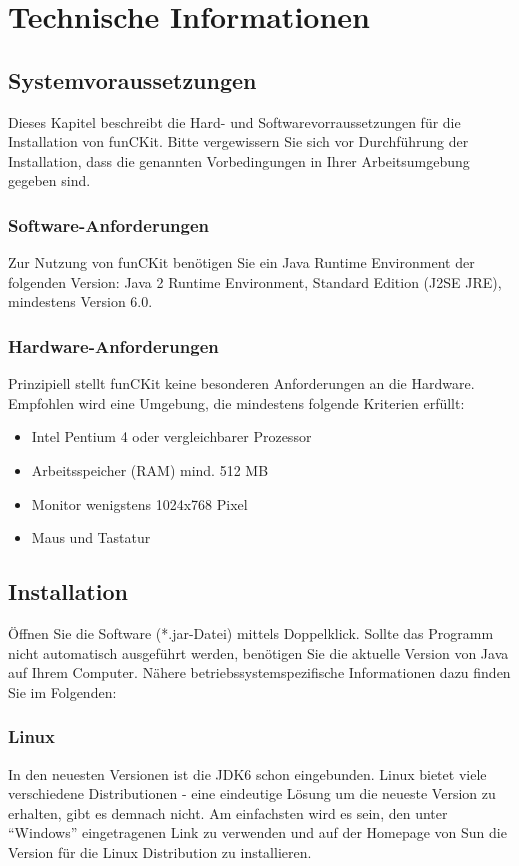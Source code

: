 \documentclass[12pt,a4paper]{scrartcl}
\newcommand{\projectName}{funCKit\xspace} %
\begin{document}
% 
%
\newpage
\section{Technische Informationen}
\subsection{Systemvoraussetzungen}
Dieses Kapitel beschreibt die Hard- und Softwarevorraussetzungen für die Installation von \projectName. Bitte vergewissern Sie sich vor Durchführung der Installation, dass die genannten Vorbedingungen in Ihrer Arbeitsumgebung gegeben sind.
\subsubsection{Software-Anforderungen}
Zur Nutzung von \projectName benötigen Sie ein Java Runtime Environment der folgenden Version: Java 2 Runtime Environment, Standard Edition (J2SE JRE), mindestens Version 6.0.
\subsubsection{Hardware-Anforderungen}
Prinzipiell stellt \projectName keine besonderen Anforderungen an die Hardware. Empfohlen wird eine Umgebung, die mindestens folgende Kriterien erfüllt:
\begin{itemize}
		 \item Intel Pentium 4 oder vergleichbarer Prozessor
		 \item Arbeitsspeicher (RAM) mind. 512 MB 
		 \item Monitor wenigstens 1024x768 Pixel
		 \item Maus und Tastatur
	 \end{itemize}
\subsection{Installation}
Öffnen Sie die Software (*.jar-Datei) mittels Doppelklick. Sollte das Programm nicht automatisch ausgeführt werden, benötigen Sie die aktuelle Version von Java auf Ihrem Computer. Nähere betriebssystemspezifische Informationen dazu finden Sie im Folgenden:

\subsubsection{Linux}
In den neuesten Versionen ist die JDK6 schon eingebunden. Linux bietet viele verschiedene Distributionen -  eine eindeutige Lösung um die neueste Version zu erhalten, gibt es demnach nicht. Am einfachsten wird es sein, den unter ``Windows'' eingetragenen Link zu verwenden und auf der Homepage von Sun die Version für die Linux Distribution zu installieren.
\end{document}
